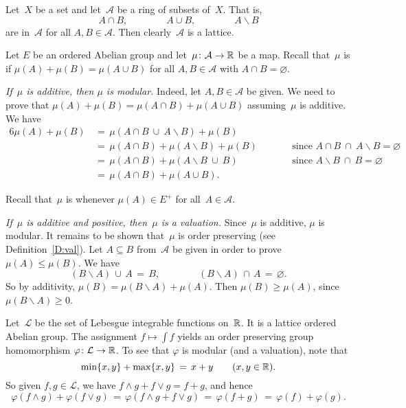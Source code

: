 \documentclass[main.tex]{subfiles}
\begin{document}
\begin{ex}
\label{E:ring-val}
Let~$X$ be a set and let~$\mathcal{A}$ be a ring of subsets of~$X$.
That is,
\begin{equation*}
A\cap B,\qquad\qquad A\cup B,\qquad\qquad A\backslash B
\end{equation*}
are in~$\mathcal{A}$ for all $A,B\in\mathcal{A}$.
Then clearly~$\mathcal{A}$ is a lattice.

Let $E$ be an ordered Abelian group
and let~$\mu\colon \mathcal{A}\rightarrow \mathbb{R}$ be a map.
Recall that~$\mu$ is  if $\mu(A) + \mu(B) = \mu(A\cup B)$
for all $A,B\in\mathcal{A}$ with $A\cap B=\varnothing$.

\emph{If~$\mu$ is additive,
then $\mu$ is modular.}
Indeed,
let $A,B\in \mathcal{A}$ be given. We need to prove that
$\mu(A) + \mu(B) =\mu(A\cap B) + \mu(A\cup B)$
assuming~$\mu$ is additive.
We have
\begin{alignat*}{6}
\mu(A) + \mu(B) \,
  & =\, \mu(A\cap B \ \cup\ A\backslash B) + \mu(B) \\ 
  & =\, \mu(A\cap B) + \mu(A\backslash B)  + \mu(B)\qquad
    && \text{since } A\cap B \ \cap\ A\backslash B = \varnothing \\ 
  & =\, \mu(A\cap B) + \mu(A\backslash B \ \cup\ B ) 
    && \text{since } A\backslash B\ \cap\ B = \varnothing \\
  & =\, \mu(A\cap B) + \mu(A\cup B).
\end{alignat*}

Recall that~$\mu$ is  whenever
$\mu(A)\in E^+$ for all~$A\in\mathcal{A}$.

\emph{If~$\mu$ is additive and positive,
then~$\mu$ is a valuation.}
Since~$\mu$ is additive,
$\mu$ is modular.
It remains to be shown that~$\mu$ is order preserving
(see Definition~\ref{D:val}).
Let $A\subseteq B$ from~$\mathcal{A}$ be given
in order to prove $\mu(A)\leq \mu(B)$.
We have
\begin{equation*}
(B\backslash A)\,\cup\, A\,=\,B,\qquad\qquad 
(B\backslash A)\,\cap\, A\,=\,\varnothing.
\end{equation*}
So by additivity, 
$\mu(B)=\mu(B\backslash A)+\mu(A)$.
Then $\mu(B)\geq \mu(A)$, since $\mu(B\backslash A)\geq 0$.
\end{ex}

\begin{ex}
\label{E:int-val}
Let~$\mathcal{L}$ be the set of Lebesgue integrable functions on~$\mathbb{R}$.
It is a lattice ordered Abelian group.
The assignment $f\mapsto \int f$ 
yields an order preserving group homomorphism
$\varphi\colon \mathcal{L}\rightarrow \mathbb{R}$.
To see that $\varphi$ is modular (and a valuation),
note that 
\begin{equation*}
\min\{x,y\}+\max\{x,y\} \,=\, x+y\qquad(x,y\in \mathbb{R}).
\end{equation*}
So given $f,g\in \mathcal{L}$,
we have $f\wedge g + f \vee g = f+ g$,
and hence
\begin{equation*}
\varphi(f\wedge g) + \varphi(f\vee g) 
\,=\,\varphi(f\wedge g + f\vee g)
\,=\, \varphi(f+g)
\,=\, \varphi (f)+\varphi(g).
\end{equation*}
\end{ex}
\end{document}

